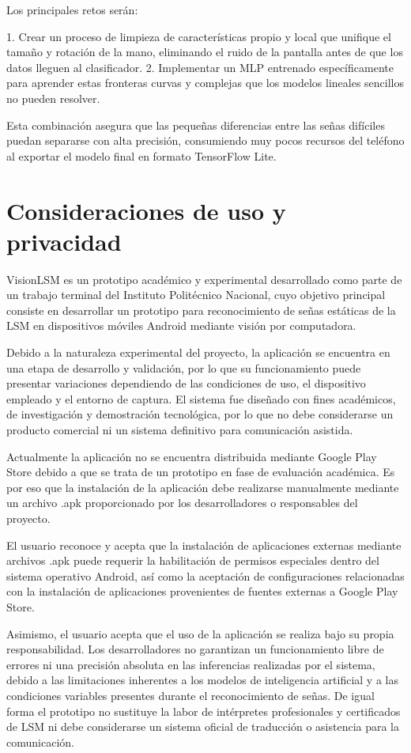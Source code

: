 	Los principales retos serán:
	
	1. Crear un proceso de limpieza de características propio y local que unifique el tamaño y rotación de la mano, eliminando el ruido de la pantalla antes de que los datos lleguen al clasificador.
	2. Implementar un MLP entrenado específicamente para aprender estas fronteras curvas y complejas que los modelos lineales sencillos no pueden resolver.
	
	Esta combinación asegura que las pequeñas diferencias entre las señas difíciles puedan separarse con alta precisión, consumiendo muy pocos recursos del teléfono al exportar el modelo final en formato TensorFlow Lite.
	
	
	\section{Consideraciones de uso y privacidad}
	
	VisionLSM es un prototipo académico y experimental desarrollado como parte de un trabajo terminal del Instituto Politécnico Nacional, cuyo objetivo principal consiste en desarrollar un prototipo para reconocimiento de señas estáticas de la LSM en dispositivos móviles Android mediante visión por computadora.
	
	Debido a la naturaleza experimental del proyecto, la aplicación se encuentra en una etapa de desarrollo y validación, por lo que su funcionamiento puede presentar variaciones dependiendo de las condiciones de uso, el dispositivo empleado y el entorno de captura. El sistema fue diseñado con fines académicos, de investigación y demostración tecnológica, por lo que no debe considerarse un producto comercial ni un sistema definitivo para comunicación asistida.
	
	Actualmente la aplicación no se encuentra distribuida mediante Google Play Store debido a que se trata de un prototipo en fase de evaluación académica. Es por eso que la instalación de la aplicación debe realizarse manualmente mediante un archivo .apk proporcionado por los desarrolladores o responsables del proyecto.
	
	El usuario reconoce y acepta que la instalación de aplicaciones externas mediante archivos .apk puede requerir la habilitación de permisos especiales dentro del sistema operativo Android, así como la aceptación de configuraciones relacionadas con la instalación de aplicaciones provenientes de fuentes externas a Google Play Store.
	
	Asimismo, el usuario acepta que el uso de la aplicación se realiza bajo su propia responsabilidad. Los desarrolladores no garantizan un funcionamiento libre de errores ni una precisión absoluta en las inferencias realizadas por el sistema, debido a las limitaciones inherentes a los modelos de inteligencia artificial y a las condiciones variables presentes durante el reconocimiento de señas. De igual forma el prototipo no sustituye la labor de intérpretes profesionales y certificados de LSM ni debe considerarse un sistema oficial de traducción o asistencia para la comunicación.
	
